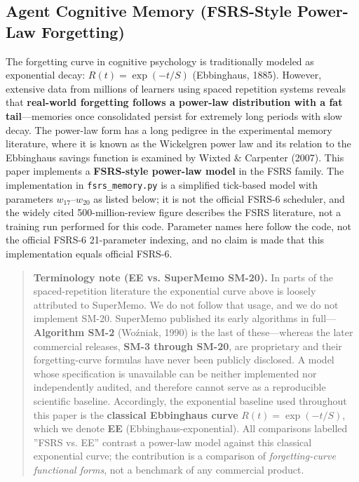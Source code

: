 \documentclass[11pt]{article}
\begin{document}
\subsection{Agent Cognitive Memory (FSRS-Style Power-Law Forgetting)}
The forgetting curve in cognitive psychology is traditionally modeled as exponential decay: $R(t) = \exp(-t/S)$ (Ebbinghaus, 1885). However, extensive data from millions of learners using spaced repetition systems reveals that \textbf{real-world forgetting follows a power-law distribution with a fat tail}---memories once consolidated persist for extremely long periods with slow decay. The power-law form has a long pedigree in the experimental memory literature, where it is known as the Wickelgren power law and its relation to the Ebbinghaus savings function is examined by Wixted \& Carpenter (2007). This paper implements a \textbf{FSRS-style power-law model} in the FSRS family. The implementation in \texttt{fsrs\_memory.py} is a simplified tick-based model with parameters $w_{17}$--$w_{20}$ as listed below; it is not the official FSRS-6 scheduler, and the widely cited 500-million-review figure describes the FSRS literature, not a training run performed for this code. Parameter names here follow the code, not the official FSRS-6 21-parameter indexing, and no claim is made that this implementation equals official FSRS-6.

\begin{quote}
\textbf{Terminology note (EE vs. SuperMemo SM-20).} In parts of the spaced-repetition literature the exponential curve above is loosely attributed to SuperMemo. We do not follow that usage, and we do not implement SM-20. SuperMemo published its early algorithms in full---\textbf{Algorithm SM-2} (Woźniak, 1990) is the last of these---whereas the later commercial releases, \textbf{SM-3 through SM-20}, are proprietary and their forgetting-curve formulas have never been publicly disclosed. A model whose specification is unavailable can be neither implemented nor independently audited, and therefore cannot serve as a reproducible scientific baseline. Accordingly, the exponential baseline used throughout this paper is the \textbf{classical Ebbinghaus curve} $R(t)=\exp(-t/S)$, which we denote \textbf{EE} (Ebbinghaus-exponential). All comparisons labelled ''FSRS vs. EE'' contrast a power-law model against this classical exponential curve; the contribution is a comparison of \textit{forgetting-curve functional forms}, not a benchmark of any commercial product.
\end{quote}
\end{document}
